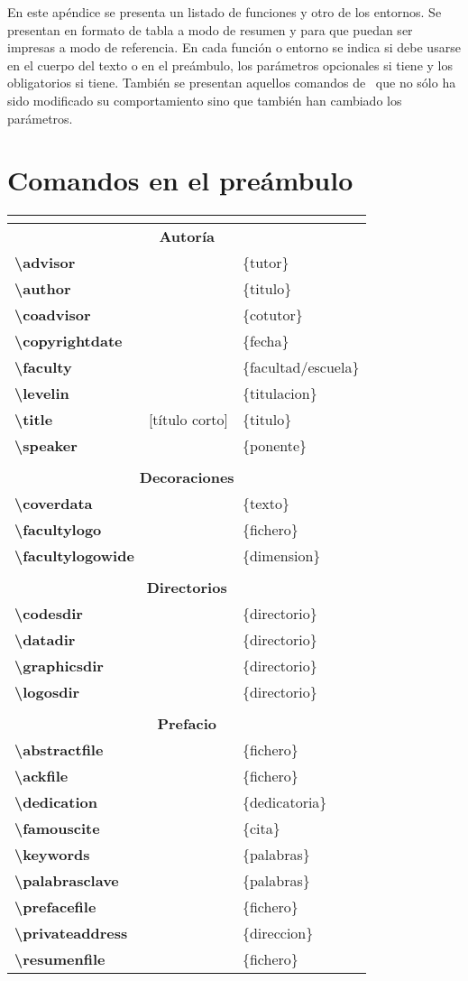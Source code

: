 En este apéndice se presenta un listado de funciones y otro de los entornos. Se presentan en formato de tabla a modo de resumen y para que puedan ser impresas a modo de referencia. En cada función o entorno se indica si debe usarse en el cuerpo del texto o en el preámbulo, los parámetros opcionales si tiene y los obligatorios si tiene. También se presentan aquellos comandos de \LaTeXe\ que no sólo ha sido modificado su comportamiento sino que también han cambiado los parámetros.

\def\funcl#1#2#3{\textbf{\textbackslash#1}&#2&#3\\}
\def\entorn#1#2#3{\textbf{#1}&#2&#3\\}
\def\Bttl#1{\multicolumn{3}{c}{\small\textbf{#1}}\\}
\def\ttl#1{\hline\multicolumn{3}{|c|}{\textbf{#1}}\\\hline}
\def\myseparator{\multicolumn{3}{c}{\mbox{}}\\}

\section{Comandos en el preámbulo}
\begin{center}
\begin{scriptsize}
  \begin{longtable}{lll}
    \myseparator
    \ttl{Autoría}
    \funcl{advisor}{}{\{tutor\}}
    \funcl{author}{}{\{titulo\}}
    \funcl{coadvisor}{}{\{cotutor\}}
    \funcl{copyrightdate}{}{\{fecha\}}
    \funcl{faculty}{}{\{facultad/escuela\}}
    \funcl{levelin}{}{\{titulacion\}}
    \funcl{title}{[título corto]}{\{titulo\}}
    \funcl{speaker}{}{\{ponente\}}
    \myseparator
    \ttl{Decoraciones}
    \funcl{coverdata}{}{\{texto\}}
    \funcl{facultylogo}{}{\{fichero\}}
    \funcl{facultylogowide}{}{\{dimension\}}
    \myseparator
    \ttl{Directorios}
    \funcl{codesdir}{}{\{directorio\}}
    \funcl{datadir}{}{\{directorio\}}
    \funcl{graphicsdir}{}{\{directorio\}}
    \funcl{logosdir}{}{\{directorio\}}
    \myseparator
    \ttl{Prefacio}
    \funcl{abstractfile}{}{\{fichero\}}
    \funcl{ackfile}{}{\{fichero\}}
    \funcl{dedication}{}{\{dedicatoria\}}
    \funcl{famouscite}{}{\{cita\}}
    \funcl{keywords}{}{\{palabras\}}
    \funcl{palabrasclave}{}{\{palabras\}}
    \funcl{prefacefile}{}{\{fichero\}}
    \funcl{privateaddress}{}{\{direccion\}}
    \funcl{resumenfile}{}{\{fichero\}}
  \end{longtable}
\end{scriptsize}
\end{center}
\newpage
